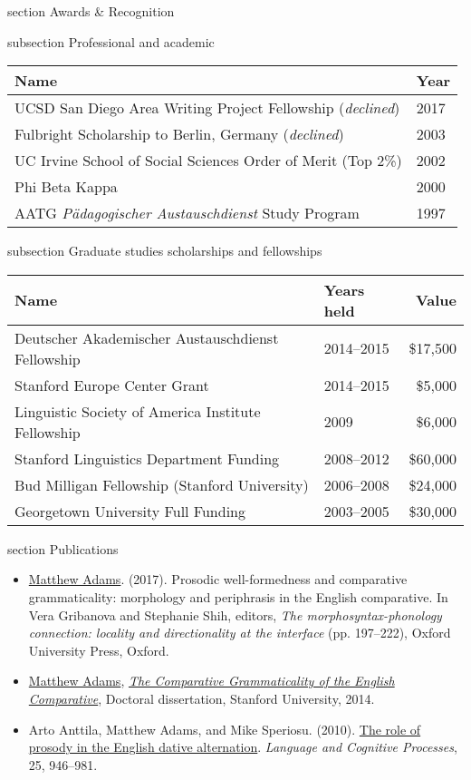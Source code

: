 \documentclass[10pt]{article}
\newcommand{\sectionhead}[1]{%
\begin{bgbox}{section}%
{\Large \textsf{#1}}%
\end{bgbox}%
}
\newcommand{\subsectionhead}[1]{%
\begin{bgbox}{subsection}%
{\small \textsf{#1}}%
\end{bgbox}%
}
\begin{document}
\newpage
\sectionhead{Awards \& Recognition}
\label{Awards}
\subsectionhead{Professional and academic}
\label{sec:orgb09e8f4}

\begin{center}
\begin{tabular}{ll}
\hline
\textbf{Name} & \textbf{Year}\\
\hline
UCSD San Diego Area Writing Project Fellowship (\emph{declined}) & 2017\\
Fulbright Scholarship to Berlin, Germany (\emph{declined}) & 2003\\
UC Irvine School of Social Sciences Order of Merit (Top 2\%) & 2002\\
Phi Beta Kappa & 2000\\
AATG \emph{Pädagogischer Austauschdienst} Study Program & 1997\\
\hline
\end{tabular}
\end{center}

\subsectionhead{Graduate studies scholarships and fellowships}
\label{Graduate-studies-scholarships-and-fellowships}
\begin{center}
\begin{tabular}{llr}
\hline
\textbf{Name} & \textbf{Years held} & \textbf{Value}\\
\hline
Deutscher Akademischer Austauschdienst Fellowship & 2014--2015 & \$17,500\\
Stanford Europe Center Grant & 2014--2015 & \$5,000\\
Linguistic Society of America Institute Fellowship & 2009 & \$6,000\\
Stanford Linguistics Department Funding & 2008--2012 & \$60,000\\
Bud Milligan Fellowship (Stanford University) & 2006--2008 & \$24,000\\
Georgetown University Full Funding & 2003--2005 & \$30,000\\
\hline
\end{tabular}
\end{center}
\sectionhead{Publications}
\label{Publications}
\small

\begin{itemize}
\item \href{https://scholar.google.com/citations?user=-k9s2XwAAAAJ\&hl=en}{Matthew Adams}. (2017). Prosodic well-formedness and comparative grammaticality: morphology and periphrasis in the English comparative. In Vera Gribanova and Stephanie Shih, editors, \emph{The morphosyntax-phonology connection: locality and directionality at the interface} (pp. 197--222), Oxford University Press, Oxford.
\item \href{https://scholar.google.com/citations?user=-k9s2XwAAAAJ\&hl=en}{Matthew Adams}, \emph{\href{https://searchworks.stanford.edu/view/10530947}{The Comparative Grammaticality of the English Comparative}}, Doctoral dissertation, Stanford University, 2014.
\item Arto Anttila, Matthew Adams, and Mike Speriosu. (2010). \href{http://www.tandfonline.com/doi/full/10.1080/01690960903525481}{The role of prosody in the English dative alternation}. \emph{Language and Cognitive Processes}, 25, 946--981.
\end{itemize}
\end{document}
